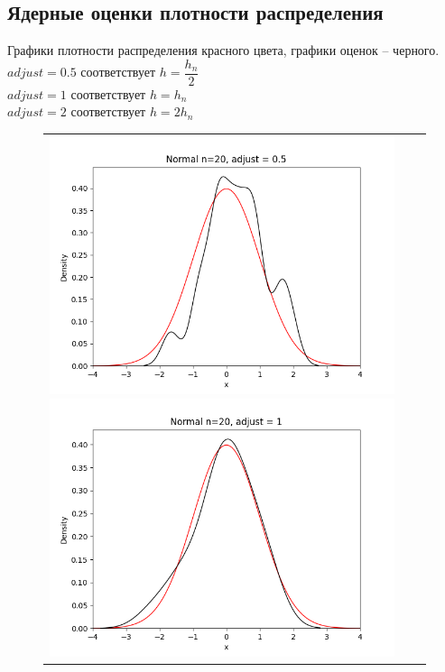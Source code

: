 \subsection{Ядерные оценки плотности распределения}

Графики плотности распределения красного цвета, графики оценок -- черного. \\
$adjust = 0.5$ соответствует $h = \dfrac{h_{n}}{2}$ \\
$adjust = 1$ соответствует $h = h_{n}$ \\
$adjust = 2$ соответствует $h = 2h_{n}$ \\

\begin{figure}[H]
	\begin{tabular}{ccc}
		\includegraphics[scale=0.33]{normal_n20_adjust0.5.png}
		\includegraphics[scale=0.33]{normal_n20_adjust1.png}

\end{tabular}
\end{figure}
